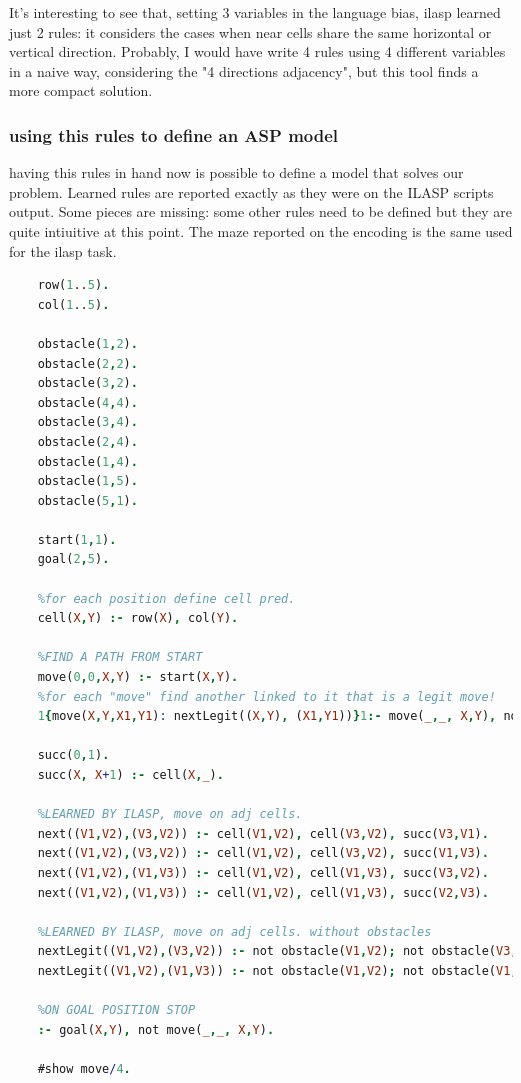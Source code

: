 \newpage
It's interesting to see that, setting 3 variables in the language bias, ilasp learned just 2 rules: it considers the cases when near cells share the same horizontal or vertical direction. 
Probably, I would have write 4 rules using 4 different variables in a naive way, considering the "4 directions adjacency", but this tool finds a more compact solution.
\subsubsection{using this rules to define an ASP model}
having this rules in hand now is possible to define a model that solves our problem. Learned rules are reported exactly as they were on the ILASP scripts output. Some pieces are missing: some other rules need to be defined but they are quite intiuitive at this point. The maze reported on the encoding is the same used for the ilasp task.
 
 \newpage
\begin{lstlisting}[language=Prolog]
	%MODEL THAT SOLVES PROBLEM OF PATHFINDING IN THE GRID
	row(1..5).
	col(1..5).
	
	obstacle(1,2).
	obstacle(2,2).
	obstacle(3,2).
	obstacle(4,4).
	obstacle(3,4).
	obstacle(2,4).
	obstacle(1,4).
	obstacle(1,5).
	obstacle(5,1).
	
	start(1,1).
	goal(2,5).
	
	%for each position define cell pred.
	cell(X,Y) :- row(X), col(Y).
	
	%FIND A PATH FROM START
	move(0,0,X,Y) :- start(X,Y).
	%for each "move" find another linked to it that is a legit move!
	1{move(X,Y,X1,Y1): nextLegit((X,Y), (X1,Y1))}1:- move(_,_, X,Y), not goal(X,Y).
	
	succ(0,1).
	succ(X, X+1) :- cell(X,_).
	
	%LEARNED BY ILASP, move on adj cells.
	next((V1,V2),(V3,V2)) :- cell(V1,V2), cell(V3,V2), succ(V3,V1).
	next((V1,V2),(V3,V2)) :- cell(V1,V2), cell(V3,V2), succ(V1,V3).
	next((V1,V2),(V1,V3)) :- cell(V1,V2), cell(V1,V3), succ(V3,V2).
	next((V1,V2),(V1,V3)) :- cell(V1,V2), cell(V1,V3), succ(V2,V3).
	
	%LEARNED BY ILASP, move on adj cells. without obstacles
	nextLegit((V1,V2),(V3,V2)) :- not obstacle(V1,V2); not obstacle(V3,V2); next((V3,V2),(V1,V2)).
	nextLegit((V1,V2),(V1,V3)) :- not obstacle(V1,V2); not obstacle(V1,V3); next((V1,V2),(V1,V3)).
	
	%ON GOAL POSITION STOP
	:- goal(X,Y), not move(_,_, X,Y).
	
	#show move/4.
\end{lstlisting}

